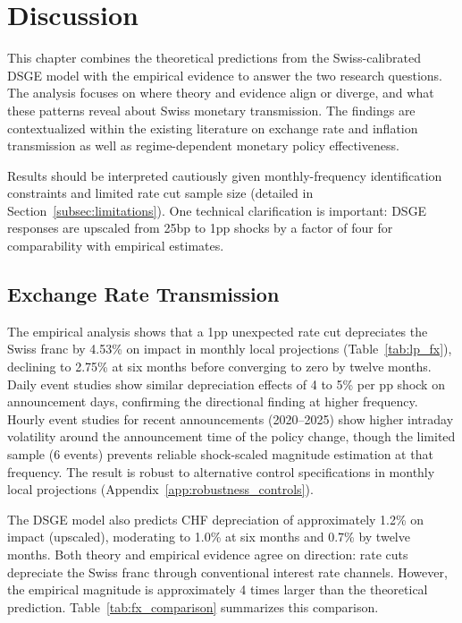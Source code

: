 \documentclass[12pt,a4paper]{article}
\begin{document}
\section{Discussion}
\label{sec:discussion}
This chapter combines the theoretical predictions from the Swiss-calibrated 
DSGE model with the empirical evidence to answer the two research questions. 
The analysis focuses on where theory and evidence align or diverge, 
and what these patterns reveal about Swiss monetary transmission. The findings are contextualized within the existing literature on exchange rate and inflation transmission as well as regime-dependent monetary policy effectiveness. 

Results should be interpreted cautiously given monthly-frequency identification constraints and limited rate cut sample size (detailed in Section~\ref{subsec:limitations}). One technical clarification is important: DSGE responses are upscaled from 25bp to 1pp shocks by a factor of four for comparability with empirical estimates.

\subsection{Exchange Rate Transmission}
\label{subsec:exchange_rate_discussion}

The empirical analysis shows that a 1pp unexpected rate cut depreciates the Swiss franc by 4.53\% on impact in monthly local projections (Table~\ref{tab:lp_fx}), declining to 2.75\% at six months before converging to zero by twelve months. Daily event studies show similar depreciation effects of 4 to 5\% per pp shock on announcement days, confirming the directional finding at higher frequency. Hourly event studies for recent announcements (2020--2025) show higher intraday volatility around the announcement time of the policy change, though the limited sample (6 events) prevents reliable shock-scaled magnitude estimation at that frequency. The result is robust to alternative control specifications in monthly local projections (Appendix~\ref{app:robustness_controls}).


The DSGE model also predicts CHF depreciation of approximately 1.2\% on impact (upscaled), moderating to 1.0\% at six months and 0.7\% by twelve months. Both theory and empirical evidence agree on direction: rate cuts depreciate the Swiss franc through conventional interest rate channels. However, the empirical magnitude is approximately 4 times larger than the theoretical prediction. Table~\ref{tab:fx_comparison} summarizes this comparison.
\end{document}
